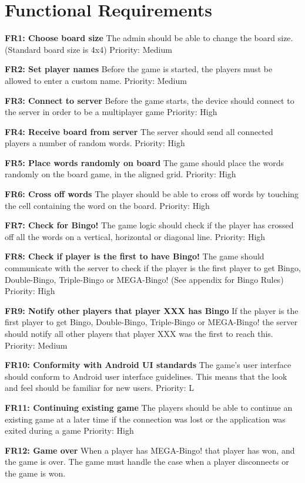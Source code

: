\section{Functional Requirements} 
\label{sec:functional requirements}

{\bf FR1: Choose board size}
The admin should be able to change the board size. (Standard board size is 4x4)
Priority: Medium

{\bf FR2: Set player names}
Before the game is started, the players must be allowed to enter a custom name.
Priority: Medium

{\bf FR3: Connect to server}
Before the game starts, the device should connect to the server in order to be a multiplayer game
Priority: High

{\bf FR4: Receive board from server}
The server should send all connected players a number of random words.
Priority: High

{\bf FR5: Place words randomly on board}
The game should place the words randomly on the board game, in the aligned grid. 
Priority: High

{\bf FR6: Cross off words}
The player should be able to cross off words by touching the cell containing the word on the board.
Priority: High

{\bf FR7: Check for Bingo!}
The game logic should check if the player has crossed off all the words on a vertical, horizontal or diagonal line.
Priority: High

{\bf FR8: Check if player is the first to have Bingo!}
The game should communicate with the server to check if the player is the first player to get Bingo, Double-Bingo, Triple-Bingo or MEGA-Bingo! (See appendix for Bingo Rules)
Priority: High

{\bf FR9: Notify other players that player XXX has Bingo}
If the player is the first player to get Bingo, Double-Bingo, Triple-Bingo or MEGA-Bingo! the server should notify all other players that player XXX was the first to reach this.
Priority: Medium

{\bf FR10: Conformity with Android UI standards}
The game's user interface should conform to Android user interface guidelines. This means that the look and feel should be familiar for new users.
Priority: L

{\bf FR11: Continuing existing game}
The players should be able to continue an existing game at a later time if the connection was lost or the application was exited during a game
Priority: High

{\bf FR12: Game over}
When a player has MEGA-Bingo! that player has won, and the game is over. The game must handle the case when a player disconnects or the game is won. 